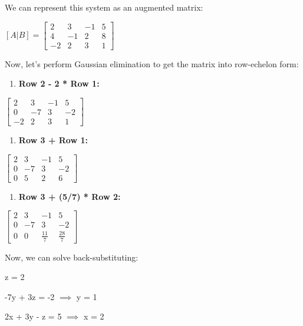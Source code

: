 \documentclass[11pt]{article}
\providecommand{\tightlist}{%
      \setlength{\itemsep}{0pt}\setlength{\parskip}{0pt}}
\begin{document}
We can represent this system as an augmented matrix:

$ [A | B] = \left[ \begin{array}{ccc|c} 2 & 3 & -1 & 5 \\ 4 & -1 & 2 & 8 \\ -2 & 2 & 3 & 1 \end{array} \right]$ 

Now, let's perform Gaussian elimination to get the matrix into
row-echelon form:

\begin{enumerate}
\def\labelenumi{\arabic{enumi}.}
\tightlist
\item
  \textbf{Row 2 - 2 * Row 1:}
\end{enumerate}

$  \left[ \begin{array}{ccc|c}
2 & 3 & -1 & 5 \\
0 & -7 & 3 & -2 \\
-2 & 2 & 3 & 1
\end{array} \right]$ 

\begin{enumerate}
\def\labelenumi{\arabic{enumi}.}
\setcounter{enumi}{1}
\tightlist
\item
  \textbf{Row 3 + Row 1:}
\end{enumerate}

$  \left[ \begin{array}{ccc|c}
2 & 3 & -1 & 5 \\
0 & -7 & 3 & -2 \\
0 & 5 & 2 & 6
\end{array} \right]$ 

\begin{enumerate}
\def\labelenumi{\arabic{enumi}.}
\setcounter{enumi}{2}
\tightlist
\item
  \textbf{Row 3 + (5/7) * Row 2:}
\end{enumerate}

$  \left[ \begin{array}{ccc|c}
2 & 3 & -1 & 5 \\
0 & -7 & 3 & -2 \\
0 & 0 & \frac{11}{7} & \frac{28}{7}
\end{array} \right]$ 

Now, we can solve back-substituting:

z = 2

-7y + 3z = -2 $ \implies$  y = 1

2x + 3y - z = 5 $ \implies$  x = 2
\end{document}

